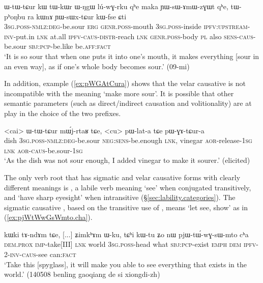  \begin{exe}
\ex \label{ex:YWsWxtCur}
\gll ɯ-tɯ-tɕur kɯ tɯ-kɯr ɯ-ŋgɯ lú-wɣ-rku qʰe maka ɲɯ-sɯ-ɤmɯ-zɣɯt qʰe, tɯ-pʰoŋbu ra kɯnɤ ɲɯ-sɯx-tɕur kɯ-fse ɕti\\
\textsc{3sg}.\textsc{poss}-\textsc{nmlz}:\textsc{deg}-be.sour \textsc{erg} \textsc{genr}.\textsc{poss}-mouth \textsc{3sg}.\textsc{poss}-inside \textsc{ipfv}:\textsc{upstream}-\textsc{inv}-put.in \textsc{lnk} at.all  \textsc{ipfv}-\textsc{caus}-\textsc{distr}-reach \textsc{lnk} \textsc{genr}.\textsc{poss}-body \textsc{pl} also \textsc{sens}-\textsc{caus}-be.sour \textsc{sbj}:\textsc{pcp}-be.like be.\textsc{aff}:\textsc{fact}\\
\glt `It is so sour that when one puts it into one's mouth, it makes everything [sour in an even way], as if one's whole body becomes sour.' (09-mi)
\end{exe}

In addition, example (\ref{ex:pWGAtCura}) shows that the velar causative   is not incompatible with the meaning `make more sour'. It is possible that other semantic parameters (such as direct/indirect causation and volitionality) are at play in the choice of the two prefixes.

 \begin{exe}
\ex \label{ex:pWGAtCura}
\gll  <cai> ɯ-tɯ-tɕur mɯ́j-rtaʁ tɕe, <cu> pɯ-lat-a tɕe pɯ-ɣɤ-tɕur-a \\
dish \textsc{3sg}.\textsc{poss}-\textsc{nmlz}:\textsc{deg}-be.sour \textsc{neg}:\textsc{sens}-be.enough \textsc{lnk}, vinegar \textsc{aor}-release-\textsc{1sg} \textsc{lnk} \textsc{aor}-\textsc{caus}-be.sour-\textsc{1sg} \\
\glt `As the dish was not sour enough, I added vinegar to make it sourer.' (elicited)
\end{exe}

The only verb root that has sigmatic and velar causative forms with clearly different meanings is , a labile verb meaning `see' when conjugated transitively, and `have sharp eyesight' when intransitive (§\ref{sec:lability.categories}). The sigmatic causative , based on the transitive use of , means `let see, show' as in (\ref{ex:pjWtWwGsWmto.cha}).


\begin{exe}
\ex \label{ex:pjWtWwGsWmto.cha}
\gll  kɯki tɤ-ndɤm tɕe, [...] ʑimkʰɤm ɯ-ku, tɕʰi kɯ-tu ʑo nɯ pjɯ-tɯ́-wɣ-sɯ-mto cʰa \\
\textsc{dem}.\textsc{prox} \textsc{imp}-take[III] \textsc{lnk} { } world \textsc{3sg}.\textsc{poss}-head what \textsc{sbj}:\textsc{pcp}-exist \textsc{emph} \textsc{dem} \textsc{ipfv}-2-\textsc{inv}-\textsc{caus}-see can:\textsc{fact} \\
\glt `Take this [spyglass], it will make you able to see everything that exists in the world.' (140508 benling gaoqiang de si xiongdi-zh)
\end{exe} 

